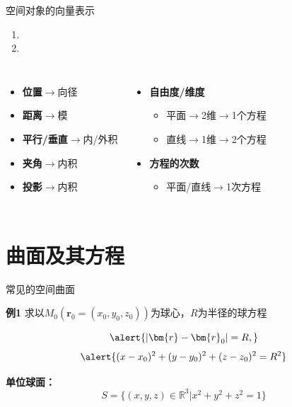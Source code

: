 \begin{frame}{空间对象的向量表示}
	\linespread{1.2}\pause 
	\begin{enumerate}
	  \item {}\pause 
	  \item {}\pause 
	\end{enumerate}
	\vspace{-1em}
	\begin{columns}[t]
			\begin{itemize}
			  \item {\bf 位置}\pause $\to$向径\pause 
			  \item {\bf 距离}\pause $\to$模\pause 
			  \item {\bf 平行/垂直}\pause $\to$内/外积\pause 
			  \item {\bf 夹角}\pause $\to$内积\pause 
			  \item {\bf 投影}\pause $\to$内积\pause 
			\end{itemize}
		\column{.5\textwidth}
			\begin{itemize}
			  \item {\bf 自由度/维度}\pause 
			  \begin{itemize}
			    \item 平面\pause $\to$2维\pause $\to$1个方程\pause 
			    \item 直线\pause $\to$1维\pause $\to$2个方程\pause 
			  \end{itemize}
			  \item {\bf 方程的次数}\pause 
			  \begin{itemize}
			    \item 平面/直线$\to$1次方程
			  \end{itemize}
			\end{itemize}
	\end{columns}
\end{frame}

\section{曲面及其方程}

\begin{frame}{常见的空间曲面}
	\linespread{1.2}\pause 
	\begin{exampleblock}{{\bf 例1}\hfill}
		求以$M_0(\bm{r}_0=(x_0,y_0,z_0))$为球心，$R$为半径的球方程
	\end{exampleblock}\pause 
	$$\alert{|\bm{r}-\bm{r}_0|=R,}$$\pause 
	$$\alert{(x-x_0)^2+(y-y_0)^2+(z-z_0)^2=R^2}$$\pause 
	
 	\vspace{1em}
	{\bf 单位球面：}
	$$S=\{(x,y,z)\in\mathbb{R}^3|x^2+y^2+z^2=1\}$$
\end{frame}

